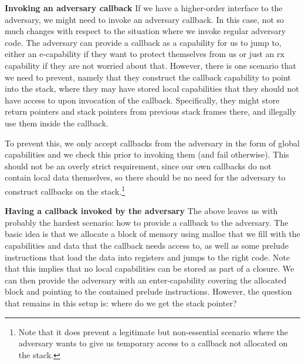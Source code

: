 \documentclass[compsoc,conference,letterpaper,fleqn]{IEEEtran}
\newcommand{\plainperm}[1]{\mathrm{#1}}
\newcommand{\exec}{\plainperm{rx}}
\newcommand{\entry}{\plainperm{e}}
\begin{document}
\textbf{Invoking an adversary callback} If we have a higher-order interface to
the adversary, we might need to invoke an adversary callback. In this case, not
so much changes with respect to the situation where we invoke regular adversary
code. The adversary can provide a callback as a capability for us to jump to,
either an $\entry$-capability if they want to protect themselves from us or just an
$\exec$ capability if they are not worried about that. However, there is one
scenario that we need to prevent, namely that they construct the callback
capability to point into the stack, where they may have stored local
capabilities that they should not have access to upon invocation of the callback.
Specifically, they might store return pointers and stack pointers from previous
stack frames there, and illegally use them inside the callback.

To prevent this, we only accept callbacks from the adversary in the form of
global capabilities and we check this prior to invoking them (and fail
otherwise). This should not be an overly strict requirement, since our own
callbacks do not contain local data themselves, so there should be no need for
the adversary to construct callbacks on the stack.\footnote{Note that it does
  prevent a legitimate but non-essential scenario where the adversary wants to
  give us temporary access to a callback not allocated on the stack.}

\textbf{Having a callback invoked by the adversary}
The above leaves us with probably the hardest scenario: how to provide a
callback to the adversary. The basic idea is that we allocate a block of memory
using malloc that we fill with the capabilities and data that the callback needs
access to, as well as some prelude instructions that load the data into
registers and jumps to the right code. Note that this implies that no local
capabilities can be stored as part of a closure. We can then provide the adversary with an
enter-capability covering the allocated block and pointing to the contained
prelude instructions. However, the question that remains in this setup is: where
do we get the stack pointer?
\end{document}
